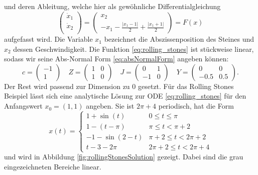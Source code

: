 und deren Ableitung, welche hier als gewöhnliche Differentialgleichung
 \begin{equation}
  \begin{pmatrix}
   \dot x_1 \\
   \dot x_2 \\
  \end{pmatrix}
 = 
 \begin{pmatrix}
  x_2 \\
  -x_1 - \frac{|x_1-1|}{2} + \frac{|x_1+1|}{2}
 \end{pmatrix}
=F(x)
\label{eq:rolling_stones}
 \end{equation}
aufgefasst wird. Die Variable $x_1$ bezeichnet die Abszissenposition des Steines und $x_2$ dessen Geschwindigkeit.
Die Funktion \eqref{eq:rolling_stones} ist stückweise linear, sodass wir seine Abs-Normal Form \eqref{eq:absNormalForm} angeben können:
\[
c = \begin{pmatrix}
     -1\\
     1
    \end{pmatrix}
\quad
 Z = \begin{pmatrix}
      1 & 0 \\
      1 & 0
     \end{pmatrix}\quad
J = \begin{pmatrix}
      0&1\\
      -1 & 0
     \end{pmatrix}\quad
 Y = \begin{pmatrix}
      0 & 0\\
      -0.5  & 0.5
     \end{pmatrix}.
\]
Der Rest wird passend zur Dimension zu $0$ gesetzt. Für das Rolling Stones Beispiel lässt sich eine analytische Lösung zur ODE \eqref{eq:rolling_stones} für den Anfangswert $x_0=(1,1)$ angeben. Sie ist $2\pi+4$ periodisch, hat die Form
\begin{equation}
 x(t) = \begin{cases}
         1+\sin(t) 	& 0\leq t \leq \pi	\\
         1-(t-\pi) 	& \pi \leq t < \pi+2	\\ 
         -1 - \sin(2-t) 	& \pi+2\leq t<2\pi+2	\\
         t-3-2\pi	& 2\pi+2 \leq t<2\pi +4
        \end{cases}
\label{eq:analyticSolRolling}
\end{equation}
und wird in Abbildung \ref{fig:rollingStonesSolution} gezeigt. Dabei sind die grau eingezeichneten Bereiche linear.

